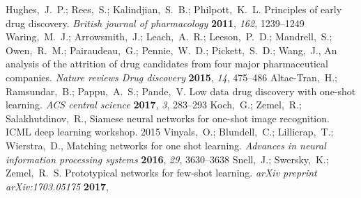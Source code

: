 \documentclass[journal=jcisd8,manuscript=article]{achemso} %
\begin{document}
\begin{mcitethebibliography}{34}
Hughes,~J.~P.; Rees,~S.; Kalindjian,~S.~B.; Philpott,~K.~L. Principles of early
  drug discovery. \emph{British journal of pharmacology} \textbf{2011},
  \emph{162}, 1239--1249\relax
\mciteBstWouldAddEndPuncttrue
\mciteSetBstMidEndSepPunct{\mcitedefaultmidpunct}
{\mcitedefaultendpunct}{\mcitedefaultseppunct}\relax
\EndOfBibitem
{}
Waring,~M.~J.; Arrowsmith,~J.; Leach,~A.~R.; Leeson,~P.~D.; Mandrell,~S.;
  Owen,~R.~M.; Pairaudeau,~G.; Pennie,~W.~D.; Pickett,~S.~D.; Wang,~J.,
    An analysis of the attrition of drug candidates from four
  major pharmaceutical companies. \emph{Nature reviews Drug discovery}
  \textbf{2015}, \emph{14}, 475--486\relax
\mciteBstWouldAddEndPuncttrue
\mciteSetBstMidEndSepPunct{\mcitedefaultmidpunct}
{\mcitedefaultendpunct}{\mcitedefaultseppunct}\relax
\EndOfBibitem
{}
Altae-Tran,~H.; Ramsundar,~B.; Pappu,~A.~S.; Pande,~V. Low data drug discovery
  with one-shot learning. \emph{ACS central science} \textbf{2017}, \emph{3},
  283--293\relax
\mciteBstWouldAddEndPuncttrue
\mciteSetBstMidEndSepPunct{\mcitedefaultmidpunct}
{\mcitedefaultendpunct}{\mcitedefaultseppunct}\relax
\EndOfBibitem
{}
Koch,~G.; Zemel,~R.; Salakhutdinov,~R.,   Siamese neural networks
  for one-shot image recognition. ICML deep learning workshop. 2015\relax
\mciteBstWouldAddEndPuncttrue
\mciteSetBstMidEndSepPunct{\mcitedefaultmidpunct}
{\mcitedefaultendpunct}{\mcitedefaultseppunct}\relax
\EndOfBibitem
{}
Vinyals,~O.; Blundell,~C.; Lillicrap,~T.; Wierstra,~D., 
  Matching networks for one shot learning. \emph{Advances in neural information
  processing systems} \textbf{2016}, \emph{29}, 3630--3638\relax
\mciteBstWouldAddEndPuncttrue
\mciteSetBstMidEndSepPunct{\mcitedefaultmidpunct}
{\mcitedefaultendpunct}{\mcitedefaultseppunct}\relax
\EndOfBibitem
{}
Snell,~J.; Swersky,~K.; Zemel,~R.~S. Prototypical networks for few-shot
  learning. \emph{arXiv preprint arXiv:1703.05175} \textbf{2017}, \relax

\end{mcitethebibliography}
\end{document}
